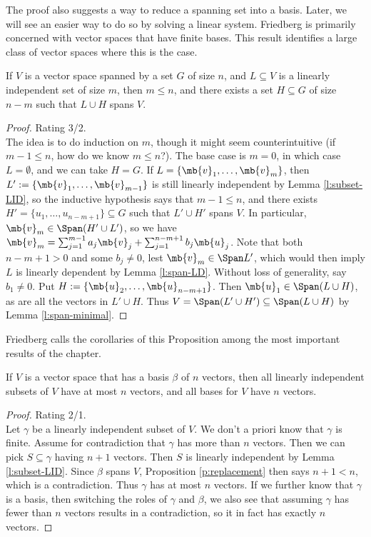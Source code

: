The proof also suggests a way to reduce a spanning set into a basis. Later, we will see an easier way to do so by solving a linear system.
Friedberg is primarily concerned with vector spaces that have finite bases. This result identifies a large class of vector spaces where this is the case.
\begin{prop}\label{p:replacement}
If $V$ is a vector space spanned by a set $G$ of size $n$, and $L \subseteq V$ is a linearly independent set of size $m$, then $m \leq n$, and there exists a set $H \subseteq G$ of size $n-m$ such that $L \cup H$ spans $V$.
\end{prop}
\begin{proof}
Rating 3/2.\\
The idea is to do induction on $m$, though it might seem counterintuitive (if $m-1 \leq n$, how do we know $m \leq n$?). The base case is $m=0$, in which case $L= \emptyset$, and we can take $H=G$.
If $L= \{ \mb{v}_1, \ldots, \mb{v}_m \}$, then $L':= \{ \mb{v}_1, \ldots, \mb{v}_{m-1}\}$ is still linearly independent by Lemma \ref{l:subset-LID}, so the inductive hypothesis says that $m-1 \leq n$, and there exists $H'= \{ u_1, \ldots,u_{n-m+1}\}\subseteq G$ such that $L' \cup H'$ spans $V$.
In particular, $\mb{v}_m \in \Span(H' \cup L')$, so we have $\mb{v}_m= \sum_{j=1}^{m-1}a_j \mb{v}_j+ \sum_{j=1}^{n-m+1}b_j \mb{u}_j$. Note that both $n-m+1>0$ and some $b_j \neq 0$, lest $\mb{v}_m \in \Span L'$, which would then imply $L$ is linearly dependent by Lemma \ref{l:span-LD}.
Without loss of generality, say $b_1 \neq 0$. Put $H:= \{ \mb{u}_2, \ldots, \mb{u}_{n-m+1}\}$. Then $\mb{u}_1 \in \Span(L \cup H)$, as are all the vectors in $L' \cup H$. Thus $V= \Span(L' \cup H') \subseteq \Span(L \cup H)$ by Lemma \ref{l:span-minimal}.
\end{proof}
Friedberg calls the corollaries of this Proposition among the most important results of the chapter.
\begin{corollary}\label{c:bases-n-same}
If $V$ is a vector space that has a basis $\beta$ of $n$ vectors, then all linearly independent subsets of $V$ have at most $n$ vectors, and all bases for $V$ have $n$ vectors.
\end{corollary}
\begin{proof}
Rating 2/1.\\
Let $\gamma$ be a linearly independent subset of $V$. We don't a priori know that $\gamma$ is finite. Assume for contradiction that $\gamma$ has more than $n$ vectors. Then we can pick $S \subseteq \gamma$ having $n+1$ vectors.
Then $S$ is linearly independent by Lemma \ref{l:subset-LID}. Since $\beta$ spans $V$, Proposition \ref{p:replacement} then says $n+1<n$, which is a contradiction.
Thus $\gamma$ has at most $n$ vectors. If we further know that $\gamma$ is a basis, then switching the roles of $\gamma$ and $\beta$, we also see that assuming $\gamma$ has fewer than $n$ vectors results in a contradiction, so it in fact has exactly $n$ vectors.
\end{proof}
